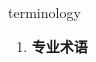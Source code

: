 
\begin{frame}
{\huge terminology}
\begin{center}
\begin{enumerate}\Large
  \item \textbf{专业术语}
\end{enumerate}
\end{center}
\end{frame}
